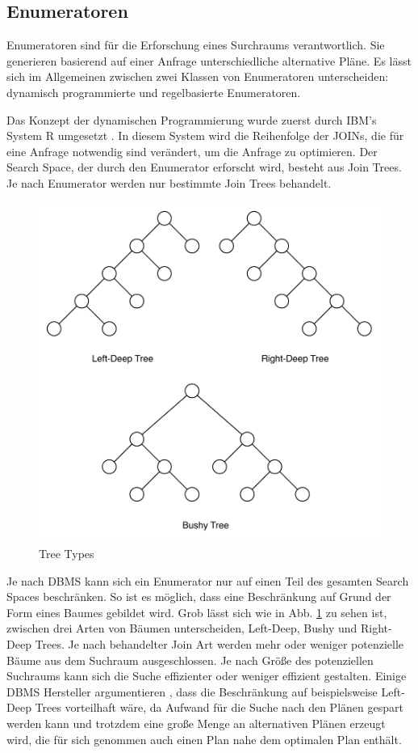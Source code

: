 \subsection{Enumeratoren}



Enumeratoren sind für die Erforschung eines Surchraums verantwortlich. Sie generieren basierend auf einer Anfrage unterschiedliche alternative Pläne. Es lässt sich im Allgemeinen zwischen zwei Klassen von Enumeratoren unterscheiden: dynamisch programmierte und regelbasierte Enumeratoren.  

Das Konzept der dynamischen Programmierung wurde zuerst durch IBM's System R umgesetzt \cite{selinger1979access}. In diesem System wird die Reihenfolge der JOINs, die für eine Anfrage notwendig sind verändert, um die Anfrage zu optimieren. Der Search Space, der durch den Enumerator erforscht wird, besteht aus Join Trees. Je nach Enumerator werden nur bestimmte Join Trees behandelt.


\begin{figure}[h]
  \centering
  \includegraphics[width=\textwidth]{02_Related_Work/TreeTypes.pdf}
  \caption{Tree Types}
  \label{TreeTypes}
\end{figure}

Je nach \ac{DBMS} kann sich ein Enumerator nur auf einen Teil des gesamten Search Spaces beschränken. So ist es möglich, dass eine Beschränkung auf Grund der Form eines Baumes gebildet wird. Grob lässt sich wie in Abb. \ref{TreeTypes} zu sehen ist, zwischen drei Arten von Bäumen unterscheiden, Left-Deep, Bushy und Right-Deep Trees. Je nach behandelter Join Art werden mehr oder weniger potenzielle Bäume aus dem Suchraum ausgeschlossen. Je nach Größe des potenziellen Suchraums kann sich die Suche effizienter oder weniger effizient gestalten. Einige \ac{DBMS} Hersteller argumentieren , dass die Beschränkung auf beispielsweise Left-Deep Trees vorteilhaft wäre, da Aufwand für die Suche nach den Plänen gespart werden kann und trotzdem eine große Menge an alternativen Plänen erzeugt wird, die für sich genommen auch einen Plan nahe dem optimalen Plan enthält. 